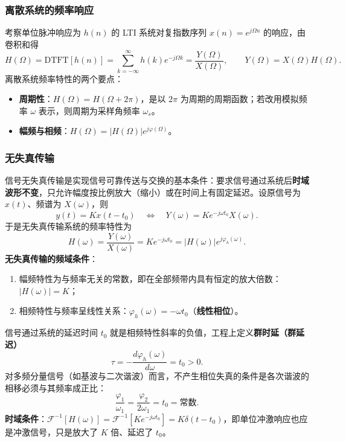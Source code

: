 \subsubsection{离散系统的频率响应}
考察单位脉冲响应为 $h(n)$ 的 LTI 系统对复指数序列 $x(n)=e^{j\Omega n}$ 的响应，由卷积和得
\begin{equation}
H(\Omega)=\mathrm{DTFT}[h(n)]=\sum_{k=-\infty}^{\infty}h(k)e^{-j\Omega k}=\frac{Y(\Omega)}{X(\Omega)},\qquad Y(\Omega)=X(\Omega)H(\Omega).
\end{equation}
离散系统频率特性的两个要点：
\begin{itemize}
\item \textbf{周期性}：$H(\Omega)=H(\Omega+2\pi)$，是以 $2\pi$ 为周期的周期函数；若改用模拟频率 $\omega$ 表示，则周期为采样角频率 $\omega_s$。
\item \textbf{幅频与相频}：$H(\Omega)=|H(\Omega)|e^{j\varphi(\Omega)}$。
\end{itemize}

\subsubsection{无失真传输}
信号无失真传输是实现信号可靠传送与交换的基本条件：要求信号通过系统后\textbf{时域波形不变}，只允许幅度按比例放大（缩小）或在时间上有固定延迟。设原信号为 $x(t)$、频谱为 $X(\omega)$，则
\begin{equation}
y(t)=Kx(t-t_0)\quad\Longleftrightarrow\quad Y(\omega)=Ke^{-j\omega t_0}X(\omega).
\end{equation}
于是无失真传输系统的频率特性为
\begin{equation}
H(\omega)=\frac{Y(\omega)}{X(\omega)}=Ke^{-j\omega t_0}=\big|H(\omega)\big|e^{j\varphi_h(\omega)}.
\end{equation}
\textbf{无失真传输的频域条件}：
\begin{enumerate}
\item 幅频特性为与频率无关的常数，即在全部频带内具有恒定的放大倍数：$|H(\omega)|=K$；
\item 相频特性与频率呈线性关系：$\varphi_h(\omega)=-\omega t_0$（\textbf{线性相位}）。
\end{enumerate}
信号通过系统的延迟时间 $t_0$ 就是相频特性斜率的负值，工程上定义\textbf{群时延（群延迟）}
\begin{equation}
\tau=-\frac{d\varphi_h(\omega)}{d\omega}=t_0>0.
\end{equation}
对多频分量信号（如基波与二次谐波）而言，不产生相位失真的条件是各次谐波的相移必须与其频率成正比：
\begin{equation}
\frac{\varphi_1}{\omega_1}=\frac{\varphi_2}{2\omega_1}=t_0=\text{常数}.
\end{equation}
\textbf{时域条件}：$\mathcal{F}^{-1}[H(\omega)]=\mathcal{F}^{-1}[Ke^{-j\omega t_0}]=K\delta(t-t_0)$，即单位冲激响应也应是冲激信号，只是放大了 $K$ 倍、延迟了 $t_0$。

